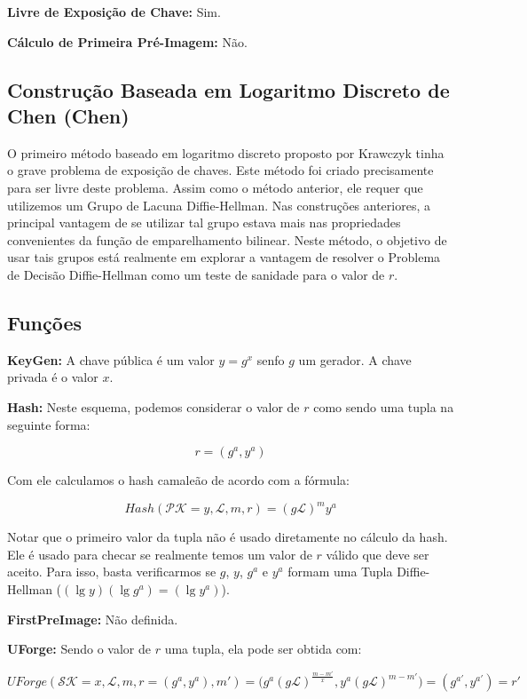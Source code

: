 \documentclass[a4paper]{article}
\begin{document}
\textbf{Livre de Exposição de Chave: } Sim.

\textbf{Cálculo de Primeira Pré-Imagem: }Não.

\subsection{Construção Baseada em Logaritmo Discreto de Chen (Chen)
  \cite{chen}}

O primeiro método baseado em logaritmo discreto proposto por Krawczyk
tinha o grave problema de exposição de chaves. Este método foi criado
precisamente para ser livre deste problema. Assim como o método
anterior, ele requer que utilizemos um Grupo de Lacuna
Diffie-Hellman. Nas construções anteriores, a principal vantagem de se
utilizar tal grupo estava mais nas propriedades convenientes da função
de emparelhamento bilinear. Neste método, o objetivo de usar tais
grupos está realmente em explorar a vantagem de resolver o Problema de
Decisão Diffie-Hellman como um teste de sanidade para o valor de $r$.

\subsection{Funções}

\textbf{KeyGen: }A chave pública é um valor $y=g^x$ senfo $g$ um
gerador. A chave privada é o valor $x$.

\textbf{Hash: }Neste esquema, podemos considerar o valor de $r$ como
sendo uma tupla na seguinte forma:

$$
r = (g^a, y^a)
$$

Com ele calculamos o hash camaleão de acordo com a fórmula:

$$
Hash(\mathcal{PK}=y, \mathcal{L}, m, r) = (g\mathcal{L})^my^a
$$

Notar que o primeiro valor da tupla não é usado diretamente no cálculo
da hash. Ele é usado para checar se realmente temos um valor de $r$
válido que deve ser aceito. Para isso, basta verificarmos se $g$, $y$,
$g^a$ e $y^a$ formam uma Tupla Diffie-Hellman ($(\lg y)(\lg g^a) =(\lg
y^a)$).

\textbf{FirstPreImage:} Não definida.

\textbf{UForge:} Sendo o valor de $r$ uma tupla, ela pode ser obtida
com:

$$UForge(\mathcal{SK}=x, \mathcal{L}, m, r=(g^a,y^a), m') =
\big(g^a(g\mathcal{L})^{\frac{m-m'}{x}}, y^a(g\mathcal{L})^{m-m'}\big) =
(g^{a'}, y^{a'}) = r'
$$
\end{document}
